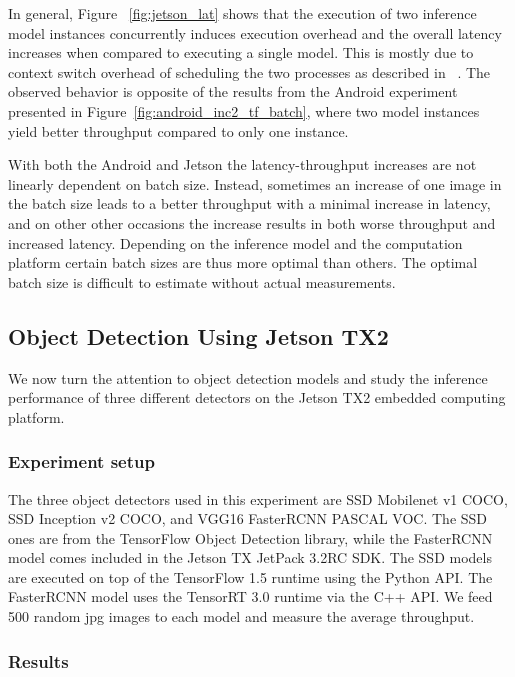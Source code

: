\documentclass[sigconf]{acmart}
\begin{document}
In general, Figure ~\ref{fig:jetson_lat} shows that the execution of two inference model instances concurrently induces execution overhead and the overall latency increases when compared to executing a single model. This is mostly due to context switch overhead of scheduling the two processes as described in ~\cite{Amert2017GPUSO}.
The observed behavior is opposite of the results from the Android experiment presented in Figure~\ref{fig:android_inc2_tf_batch}, where two model instances yield better throughput compared to only one instance.

With both the Android and Jetson the latency-throughput increases are not linearly dependent on batch size. Instead, sometimes an increase of one image in the batch size leads to a better throughput with a minimal increase in latency, and on other other occasions the increase results in both worse throughput and increased latency. Depending on the inference model and the computation platform certain batch sizes are thus more optimal than others. The optimal batch size is difficult to estimate without actual measurements.

\subsection{Object Detection Using Jetson TX2}\label{sec:object_detection_jetson}
We now turn the attention to object detection models and study the inference performance of three different detectors on the Jetson TX2 embedded computing platform.

\subsubsection{Experiment setup}

The three object detectors used in this experiment are SSD Mobilenet v1 COCO, SSD Inception v2 COCO, and VGG16 FasterRCNN PASCAL VOC. The SSD ones are from the TensorFlow Object Detection library, while the FasterRCNN model comes included in the Jetson TX JetPack 3.2RC SDK. The SSD models are executed on top of the TensorFlow 1.5 runtime using the Python API. The FasterRCNN model uses the TensorRT 3.0 runtime via the C++ API. We feed 500 random jpg images to each model and measure the average throughput.

\subsubsection{Results}
\end{document}
